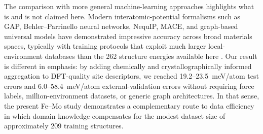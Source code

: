 \documentclass[prb,twocolumn,floatfix]{revtex4-2}
\begin{document}
The comparison with more general machine-learning approaches highlights what is and is not claimed here. Modern interatomic-potential formalisms such as GAP, Behler--Parrinello neural networks, NequIP, MACE, and graph-based universal models have demonstrated impressive accuracy across broad materials spaces, typically with training protocols that exploit much larger local-environment databases than the 262 structure energies available here \cite{Bartok2010GAP,BehlerParrinello2007,Batzner2022NequIP,Batatia2022MACE,ChenOng2022M3GNet,Butler2018,Zuo2020}. Our result is different in emphasis: by adding chemically and crystallographically informed aggregation to DFT-quality site descriptors, we reached 19.2--23.5~meV/atom test errors and 6.0--58.4~meV/atom external-validation errors without requiring force labels, million-environment datasets, or generic graph architectures. In that sense, the present Fe--Mo study demonstrates a complementary route to data efficiency in which domain knowledge compensates for the modest dataset size of approximately 209 training structures.
\end{document}
